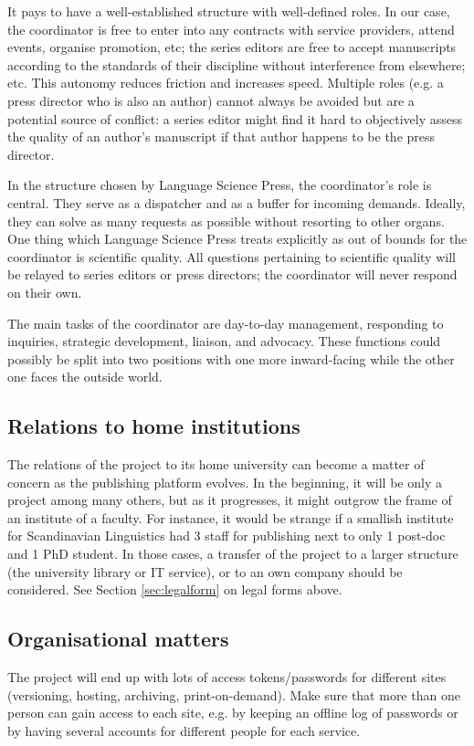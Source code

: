 \documentclass[guidelines,nonflat,modfonts] {langsci/langscibook}
\begin{document}
It pays to have a well-established structure with well-defined roles. In our case, the coordinator is free to enter into any contracts with service providers, attend events, organise promotion, etc; the series editors are free to accept manuscripts according to the standards of their discipline without interference from elsewhere; etc.  This autonomy reduces friction and increases speed. Multiple roles (e.g. a press director who is also an author) cannot always be avoided but are a potential source of conflict: a series editor might find it hard to objectively assess the quality of an author's manuscript if that author happens to be the press director. 

In the structure chosen by Language Science Press, the coordinator's role is central. They serve as a dispatcher and as a buffer for incoming demands. Ideally, they can solve as many requests as possible without resorting to other organs. One thing which Language Science Press treats explicitly as out of bounds for the coordinator is scientific quality. All questions pertaining to scientific quality will be relayed to series editors or press directors; the coordinator will never respond on their own. 

The main tasks of the coordinator are day-to-day management, responding to inquiries, strategic development, liaison, and advocacy. These functions could possibly be split into two positions with one more inward-facing while the other one faces the outside world. 

\subsection{Relations to home institutions}
The relations of the project to its home university can become a matter of concern as the publishing platform evolves. In the beginning, it will be only a project among many others, but as it progresses, it might outgrow the frame of an institute of a faculty. For instance, it would be strange if a smallish institute for Scandinavian Linguistics had 3 staff for publishing next to only 1 post-doc and 1 PhD student. In those cases, a transfer of the project to a larger structure (the university library or IT service), or to an own company should be considered. See Section \ref{sec:legalform} on legal forms above. 

\subsection{Organisational matters}
The project will end up with lots of access tokens/passwords for different sites (versioning, hosting, archiving, print-on-demand). Make sure that more than one person can gain access to each site, e.g. by keeping an offline log of passwords or by having several accounts for different people for each service. 
\end{document}
